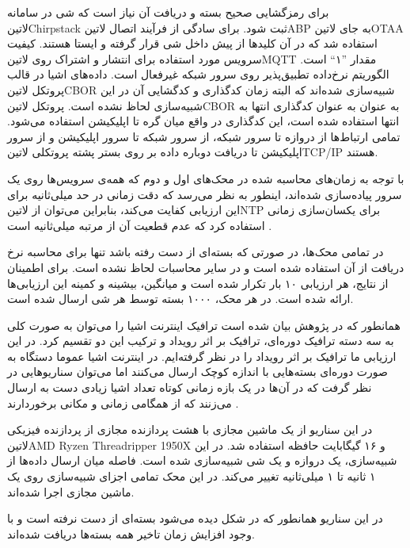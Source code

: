 برای رمزگشایی صحیح بسته و دریافت آن نیاز است
که شی در سامانه ‌لاتین{Chirpstack} ثبت شود. برای سادگی از فرآیند اتصال ‌لاتین{ABP} به جای ‌لاتین{OTAA} استفاده شد که در آن کلیدها از پیش
داخل شی قرار گرفته و ایستا هستند.
کیفیت سرویس مورد استفاده برای انتشار و اشتراک روی ‌لاتین{MQTT} مقدار ''۱`` است. الگوریتم نرخ‌داده تطبیق‌پذیر روی سرور شبکه غیرفعال است.
داده‌های اشیا در قالب پروتکل ‌لاتین{CBOR} شبیه‌سازی شده‌اند که البته زمان کدگذاری و کدگشایی آن در این شبیه‌سازی لحاظ نشده است.
پروتکل ‌لاتین{CBOR} به عنوان به عنوان کدگذاری انتها به انتها استفاده شده است، این کدگذاری در واقع میان گره تا اپلیکیشن استفاده می‌شود.
تمامی ارتباط‌ها از دروازه تا سرور شبکه، از سرور شبکه تا سرور اپلیکیشن و از سرور اپلیکیشن تا دریافت دوباره داده
بر روی بستر پشته پروتکلی ‌لاتین{TCP/IP} هستند.

با توجه به زمان‌های محاسبه شده در محک‌های اول و دوم که همه‌ی سرویس‌ها روی یک سرور پیاده‌سازی شده‌اند، اینطور به نظر می‌رسد که دقت زمانی در حد میلی‌ثانیه
برای این ارزیابی کفایت می‌کند، بنابراین می‌توان از ‌لاتین{NTP} برای یکسان‌سازی زمانی استفاده کرد که عدم قطعیت آن از مرتبه میلی‌ثانیه است .

در تمامی محک‌ها، در صورتی که بسته‌ای از دست رفته باشد تنها برای محاسبه نرخ دریافت از آن استفاده شده است و در سایر محاسبات لحاظ نشده است.
برای اطمینان از نتایج، هر ارزیابی ۱۰ بار تکرار شده است و میانگین، بیشینه و کمینه این ارزیابی‌ها ارائه شده است. در هر محک، ۱۰۰۰ بسته توسط هر شی ارسال شده است.

همانطور که در پژوهش  بیان شده است ترافیک اینترنت اشیا را می‌توان به صورت کلی به سه دسته ترافیک دوره‌ای، ترافیک بر اثر رویداد و ترکیب این دو تقسیم کرد.
در این ارزیابی ما ترافیک بر اثر رویداد را در نظر گرفته‌ایم.
در اینترنت اشیا عموما دستگاه به صورت دوره‌ای بسته‌هایی با اندازه کوچک ارسال می‌کنند اما می‌توان سناریوهایی در نظر گرفت که در آن‌ها در یک بازه زمانی کوتاه
تعداد اشیا زیادی دست به ارسال می‌زنند که از همگامی زمانی و مکانی برخوردارند .


در این سناریو از یک ماشین مجازی با هشت پردازنده مجازی از پردازنده فیزیکی
‌لاتین{AMD Ryzen Threadripper 1950X}
و ۱۶ گیگابایت حافظه استفاده شد.
در این شبیه‌سازی، یک دروازه و یک شی شبیه‌سازی شده است. فاصله میان ارسال داده‌ها از ۱ ثانیه تا ۱ میلی‌ثانیه تغییر می‌کند.
در این محک تمامی اجزای شبیه‌سازی روی یک ماشین مجازی اجرا شده‌اند.

در این سناریو همانطور که در شکل 
دیده می‌شود بسته‌ای از دست نرفته است و با وجود افزایش زمان تاخیر همه بسته‌ها دریافت شده‌اند.

